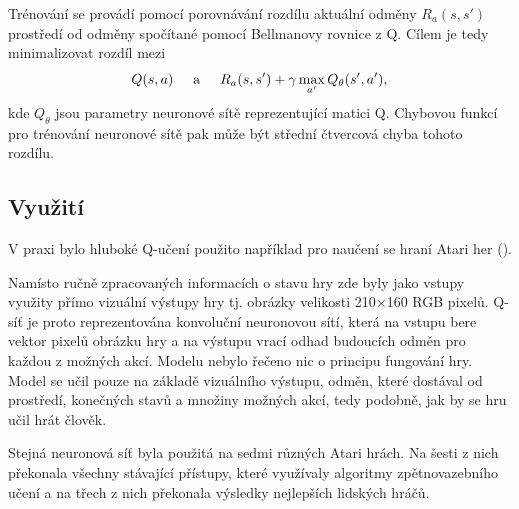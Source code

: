 Trénování se provádí pomocí porovnávání rozdílu aktuální odměny $R_a(s,s')$ prostředí od odměny spočítané pomocí Bellmanovy rovnice z Q.
Cílem je tedy minimalizovat rozdíl mezi \[Q(s,a) \hspace{5mm}\text{a}\hspace{5mm}  R_a(s,s') + \gamma\max_{a'}Q_{\theta}(s',a'),\] kde $Q_{\theta}$ jsou parametry neuronové sítě reprezentující matici Q.
Chybovou funkcí pro trénování neuronové sítě pak může být střední čtvercová chyba tohoto rozdílu.



\subsection{Využití}
V praxi bylo hluboké Q-učení použito například pro naučení se hraní Atari her (\cite{atari}). 


Namísto ručně zpracovaných informacích o stavu hry zde byly jako vstupy využity přímo vizuální výstupy hry tj. obrázky velikosti 210×160 RGB pixelů.
Q-síť je proto reprezentována konvoluční neuronovou sítí, která na vstupu bere vektor pixelů obrázku hry a na výstupu vrací odhad budoucích odměn pro každou z možných akcí.
Modelu nebylo řečeno nic o principu fungování hry. Model se učil pouze na základě vizuálního výstupu, odměn, které dostával od prostředí, konečných stavů a množiny možných akcí, tedy podobně, jak by se hru učil hrát člověk.

Stejná neuronová síť byla použitá na sedmi různých Atari hrách. Na šesti z nich překonala všechny stávající přístupy, které využívaly algoritmy zpětnovazebního učení a na třech z nich překonala výsledky nejlepších lidských hráčů.


